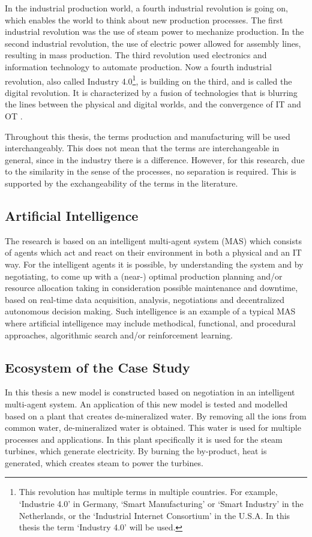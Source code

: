 In the industrial production world, a fourth industrial revolution is going on, which enables the world to think about new production processes. The first industrial revolution was the use of steam power to mechanize production. In the second industrial revolution, the use of electric power allowed for assembly lines, resulting in mass production. The third revolution used electronics and information technology to automate production. Now a fourth industrial revolution, also called Industry 4.0\footnote{This revolution has multiple terms in multiple countries. For example, `Industrie 4.0' in Germany, `Smart Manufacturing' or `Smart Industry' in the Netherlands, or the `Industrial Internet Consortium' in the U.S.A. In this thesis the term `Industry 4.0' will be used.}, is building on the third, and is called the digital revolution. It is characterized by a fusion of technologies that is blurring the lines between the physical and digital worlds, and the convergence of IT and OT \citep{leitao2016smart}.

Throughout this thesis, the terms production and manufacturing will be used interchangeably. This does not mean that the terms are interchangeable in general, since in the industry there is a difference. However, for this research, due to the similarity in the sense of the processes, no separation is required. This is supported by the exchangeability of the terms in the literature.

\subsection{Artificial Intelligence}
The research is based on an intelligent multi-agent system (MAS) which consists of agents which act and react on their environment in both a physical and an IT way. For the intelligent agents it is possible, by understanding the system and by negotiating, to come up with a (near-) optimal production planning and/or resource allocation  taking in consideration possible maintenance and downtime, based on real-time data acquisition, analysis, negotiations and decentralized autonomous decision making. Such intelligence is an example of a typical MAS where artificial intelligence may include methodical, functional, and procedural approaches, algorithmic search and/or reinforcement learning.

\subsection{Ecosystem of the Case Study}
\label{sec:intro_ecosystem}
In this thesis a new model is constructed based on negotiation in an intelligent multi-agent system. An application of this new model is tested and modelled based on a plant that creates de-mineralized water. By removing all the ions from common water, de-mineralized water is obtained. This water is used for multiple processes and applications. In this plant specifically it is used for the steam turbines, which generate electricity. By burning the by-product, heat is generated, which creates steam to power the turbines.

